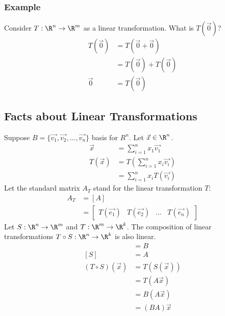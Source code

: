 \documentclass[letterpaper, 12pt]{math}
\begin{document}
\subsubsection*{Example}
Consider \( T:\R^n\to\R^m \) as a linear transformation. What is \( T(\vec{0})
\)?
\begin{align*}
  T(\vec{0}) &= T(\vec{0}+\vec{0}) \\
  &= T(\vec{0})+T(\vec{0}) \\
  \vec{0} &= T(\vec{0})
\end{align*}

\subsection*{Facts about Linear Transformations}
Suppose \( B = \{\vec{v_1},\vec{v_2},\dots,\vec{v_n}\} \) basis for \( R^n \).
Let \( \vec{x}\in\R^n \).
\begin{align*}
  \vec{x} &= \sum_{i=1}^{n}x_1\vec{v_1} \\
  T(\vec{x}) &= T\left(\sum_{i=1}^{n}x_i\vec{v_i}\right) \\
  &= \sum_{i=1}^{n}x_iT(\vec{v_i})
\end{align*}
Let the standard matrix \( A_T \) stand for the linear transformation \( T \):
\begin{align*}
  A_T &= [A] \\
  &= \begin{bmatrix}
    T(\vec{e_1}) & T(\vec{e_2}) & \dots & T(\vec{e_n})
  \end{bmatrix}
\end{align*}
Let \( S:\R^n\to\R^m \) and \( T:\R^m\to\R^k \). The composition of linear
transformations \( T\circ S:\R^n\to\R^k \) is also linear.
\begin{align*}
  [T] &= B \\
  [S] &= A \\
  (T\circ S)(\vec{x}) &= T(S(\vec{x})) \\
  &= T(A\vec{x}) \\
  &= B(A\vec{x}) \\
  &= (BA)\vec{x}
\end{align*}
\end{document}
